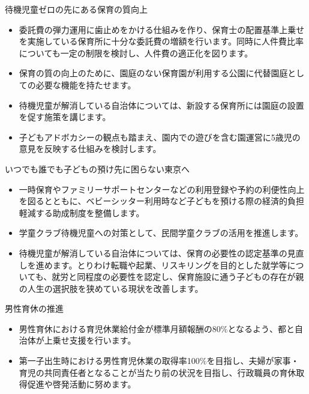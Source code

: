\documentclass[dvipdfmx]{beamer}
\begin{document}
    \begin{frame}{待機児童ゼロの先にある保育の質向上}{}
        \begin{small}
            \begin{itemize}
                \setlength{\itemsep}{2mm}
                \item 委託費の弾力運用に歯止めをかける仕組みを作り、保育士の配置基準上乗せを実施している保育所に十分な委託費の増額を行います。同時に人件費比率についても一定の制限を検討し、人件費の適正化を図ります。
                \item 保育の質の向上のために、園庭のない保育園が利用する公園に代替園庭としての必要な機能を持たせます。
                \item 待機児童が解消している自治体については、新設する保育所には園庭の設置を促す施策を講じます。
                \item 子どもアドボカシーの観点も踏まえ、園内での遊びを含む園運営に5歳児の意見を反映する仕組みを検討します。
            \end{itemize}
        \end{small}
    \end{frame}

    \begin{frame}{いつでも誰でも子どもの預け先に困らない東京へ}{}
        \begin{small}
            \begin{itemize}
                \setlength{\itemsep}{2mm}
                \item 一時保育やファミリーサポートセンターなどの利用登録や予約の利便性向上を図るとともに、ベビーシッター利用時など子どもを預ける際の経済的負担軽減する助成制度を整備します。
                \item 学童クラブ待機児童への対策として、民間学童クラブの活用を推進します。
                \item 待機児童が解消している自治体については、保育の必要性の認定基準の見直しを進めます。とりわけ転職や起業、リスキリングを目的とした就学等についても、就労と同程度の必要性を認定し、保育施設に通う子どもの存在が親の人生の選択肢を狭めている現状を改善します。
            \end{itemize}
        \end{small}
    \end{frame}

    \begin{frame}{男性育休の推進}{}
        \begin{small}
            \begin{itemize}
                \setlength{\itemsep}{2mm}
                \item 男性育休における育児休業給付金が標準月額報酬の80\%となるよう、都と自治体が上乗せ支援を行います。
                \item 第一子出生時における男性育児休業の取得率100\%を目指し、夫婦が家事・育児の共同責任者となることが当たり前の状況を目指し、行政職員の育休取得促進や啓発活動に努めます。
            \end{itemize}
        \end{small}
    \end{frame}
\end{document}
